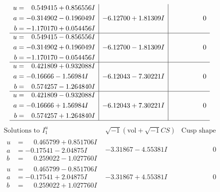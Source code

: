 \documentclass[1p]{elsarticle_modified}
\theoremstyle{definition}
\newcommand{\I}{\sqrt{-1}}
\begin{document}
$$\begin{array}{c|c|c}
\begin{aligned}
u &= \phantom{-}0.549415 + 0.856556 I \\
a &= -0.314902 - 0.196049 I \\
b &= -1.170170 + 0.054456 I\end{aligned}
 & -6.12700 + 1.81309 I & \phantom{-0.000000 } 0 \\ \hline\begin{aligned}
u &= \phantom{-}0.549415 - 0.856556 I \\
a &= -0.314902 + 0.196049 I \\
b &= -1.170170 - 0.054456 I\end{aligned}
 & -6.12700 - 1.81309 I & \phantom{-0.000000 } 0 \\ \hline\begin{aligned}
u &= \phantom{-}0.421809 + 0.932088 I \\
a &= -0.16666 - 1.56984 I \\
b &= \phantom{-}0.574257 - 1.264840 I\end{aligned}
 & -6.12043 - 7.30221 I & \phantom{-0.000000 } 0 \\ \hline\begin{aligned}
u &= \phantom{-}0.421809 - 0.932088 I \\
a &= -0.16666 + 1.56984 I \\
b &= \phantom{-}0.574257 + 1.264840 I\end{aligned}
 & -6.12043 + 7.30221 I & \phantom{-0.000000 } 0\\
 \hline 
 \end{array}$$\newpage$$\begin{array}{c|c|c}  
\text{Solutions to }I^u_{1}& \I (\text{vol} + \sqrt{-1}CS) & \text{Cusp shape}\\
 \hline 
\begin{aligned}
u &= \phantom{-}0.465799 + 0.851706 I \\
a &= -0.17541 - 2.04875 I \\
b &= \phantom{-}0.259022 - 1.027760 I\end{aligned}
 & -3.31867 - 4.55381 I & \phantom{-0.000000 } 0 \\ \hline\begin{aligned}
u &= \phantom{-}0.465799 - 0.851706 I \\
a &= -0.17541 + 2.04875 I \\
b &= \phantom{-}0.259022 + 1.027760 I\end{aligned}
 & -3.31867 + 4.55381 I & \phantom{-0.000000 } 0 \\ \hline\begin{aligned}

\end{aligned}
\end{array}$$
\end{document}
